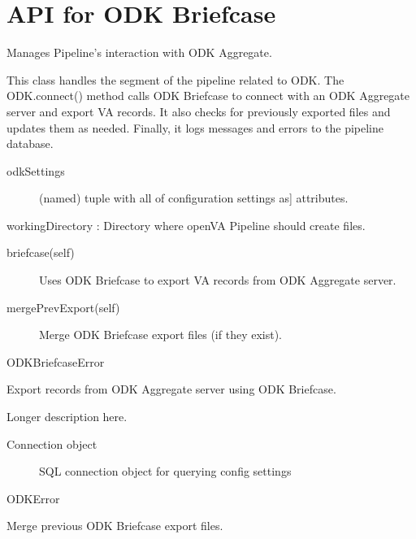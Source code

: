 \documentclass[letterpaper,12pt,english]{sphinxmanual}
\begin{document}
\section{API for ODK Briefcase}
\label{\detokenize{help:api-for-odk-briefcase}}

\begin{fulllineitems}
\label{\detokenize{help:odk.ODK}}
Manages Pipeline’s interaction with ODK Aggregate.

This class handles the segment of the pipeline related to ODK.  The
ODK.connect() method calls ODK Briefcase to connect with an ODK Aggregate
server and export VA records.  It also checks for previously exported files
and updates them as needed.  Finally, it logs messages and errors to the
pipeline database.
\begin{description}
\item[{odkSettings}] \leavevmode{[}(named) tuple with all of configuration settings as{]}
attributes.

\end{description}

workingDirectory : Directory where openVA Pipeline should create files.
\begin{description}
\item[{briefcase(self)}] \leavevmode
Uses ODK Briefcase to export VA records from ODK Aggregate server.

\item[{mergePrevExport(self)}] \leavevmode
Merge ODK Briefcase export files (if they exist).

\end{description}

ODKBriefcaseError

\begin{fulllineitems}
\label{\detokenize{help:odk.ODK.briefcase}}
Export records from ODK Aggregate server using ODK Briefcase.

Longer description here.
\begin{description}
\item[{Connection object}] \leavevmode
SQL connection object for querying config settings

\end{description}

ODKError

\end{fulllineitems}


\begin{fulllineitems}
\label{\detokenize{help:odk.ODK.mergeToPrevExport}}
Merge previous ODK Briefcase export files.

\end{fulllineitems}


\end{fulllineitems}
\end{document}

